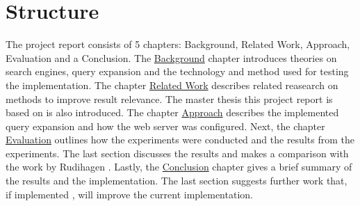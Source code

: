 \section{Structure}
The project report consists of 5 chapters: Background, Related Work, Approach, Evaluation and a Conclusion.
The \hyperref[ch:background]{Background} chapter introduces theories on search engines,
query expansion and the technology and method used for testing the implementation.
The chapter \hyperref[ch:related-work]{Related Work} describes related reasearch on methods to improve result relevance.
The master thesis this project report is based on is also introduced.
The chapter \hyperref[ch:approach]{Approach} describes the implemented query expansion and how the web server was configured.
Next, the chapter \hyperref[ch:evaluation]{Evaluation} outlines how the experiments were conducted and the results from the experiments.
The last section discusses the results and makes a comparison with the work by Rudihagen \cite{master-thesis}.
Lastly, the \hyperref[ch:conclusion]{Conclusion} chapter gives a brief summary of the results and the implementation.
The last section suggests further work that, if implemented , will improve the current implementation.
